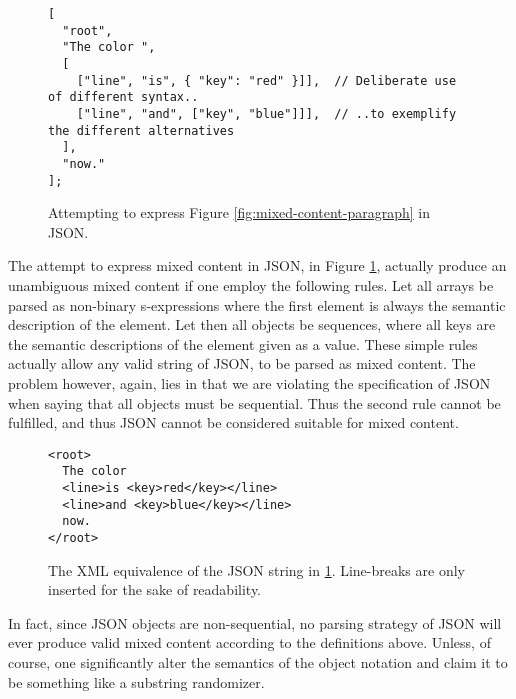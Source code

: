 \documentclass{scrreprt}
\begin{document}
\begin{figure}[h]
\begin{lstlisting}
[
  "root",
  "The color ",
  [
    ["line", "is", { "key": "red" }]],  // Deliberate use of different syntax..
    ["line", "and", ["key", "blue"]]],  // ..to exemplify the different alternatives
  ],
  "now."
];
\end{lstlisting}
\caption{Attempting to express Figure \ref{fig:mixed-content-paragraph} in JSON.}
\label{fig:mixed-content-json}
\end{figure}

The attempt to express mixed content in JSON, in Figure \ref{fig:mixed-content-json}, actually produce an unambiguous mixed content if one employ the following rules. Let all arrays be parsed as non-binary s-expressions where the first element is always the semantic description of the element. Let then all objects be sequences, where all keys are the semantic descriptions of the element given as a value. These simple rules actually allow any valid string of JSON, to be parsed as mixed content. The problem however, again, lies in that we are violating the specification of JSON when saying that all objects must be sequential. Thus the second rule cannot be fulfilled, and thus JSON cannot be considered suitable for mixed content.

\begin{figure}[h]
\begin{lstlisting}
<root>
  The color
  <line>is <key>red</key></line>
  <line>and <key>blue</key></line>
  now.
</root>
\end{lstlisting}
\caption{The XML equivalence of the JSON string in \ref{fig:mixed-content-json}. Line-breaks are only inserted for the sake of readability.}
\label{fig:json-mixed-content-xml-equivalence}
\end{figure}

In fact, since JSON objects are non-sequential, no parsing strategy of JSON will ever produce valid mixed content according to the definitions above. Unless, of course, one significantly alter the semantics of the object notation and claim it to be something like a substring randomizer.



\end{document}
